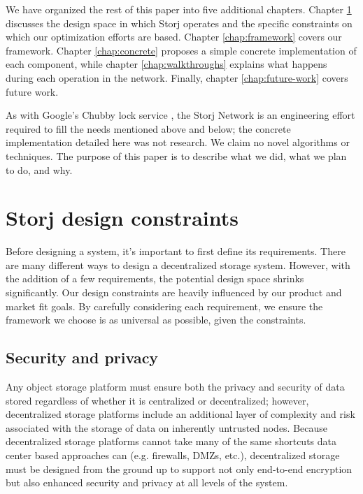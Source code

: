 \documentclass[8pt,fleqn,openany]{book}
\begin{document}
We have organized the rest of this paper into five additional
chapters. Chapter \ref{chap:design-constraints} discusses the design space
in which Storj operates and the specific constraints on which
our optimization efforts are based.
Chapter \ref{chap:framework} covers our framework. Chapter
\ref{chap:concrete}
proposes a simple concrete implementation of each component,
while chapter \ref{chap:walkthroughs} explains what happens
during each operation in the network. Finally, chapter
\ref{chap:future-work} covers future work.

As with Google's Chubby lock service \cite{chubby}, the Storj Network is an
engineering effort required to fill the needs mentioned above and below;
the concrete implementation detailed here was not research.
We claim no novel algorithms or techniques. The purpose
of this paper is to describe what we did, what we plan to do, and why.

\chapter{Storj design constraints}\label{chap:design-constraints}

Before designing a system, it's important to first define its requirements.
There are many different ways to design a decentralized storage system. However,
with the addition of a few requirements, the potential design space shrinks
significantly.
Our design constraints are heavily influenced by our product and
market fit goals.
By carefully considering each requirement, we ensure the framework
we choose is as universal as possible, given the constraints.

\section{Security and privacy}

Any object storage platform must ensure both the privacy and
security of data stored regardless of whether it is centralized or decentralized; however,
decentralized storage platforms include an additional layer of
complexity and risk associated with the storage of data on inherently
untrusted nodes. Because decentralized storage platforms cannot take many
of the same shortcuts data center based approaches can (e.g. firewalls, DMZs,
etc.), decentralized storage must be designed from the ground up to support
not only end-to-end encryption but also enhanced security and privacy at all levels of the
system.
\end{document}
